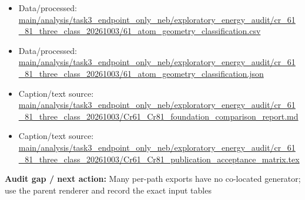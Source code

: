 \documentclass[10pt]{article}
\newcommand{\statusline}[1]{\colorbox{gray!12}{\parbox{0.96\linewidth}{#1}}}
\begin{document}
\begin{itemize}[leftmargin=1.4em,noitemsep]
\item Data/processed: \begingroup\scriptsize\url{main/analysis/task3_endpoint_only_neb/exploratory_energy_audit/cr_61_81_three_class_20261003/61_atom_geometry_classification.csv}\endgroup
\item Data/processed: \begingroup\scriptsize\url{main/analysis/task3_endpoint_only_neb/exploratory_energy_audit/cr_61_81_three_class_20261003/61_atom_geometry_classification.json}\endgroup
\item Caption/text source: \begingroup\scriptsize\url{main/analysis/task3_endpoint_only_neb/exploratory_energy_audit/cr_61_81_three_class_20261003/Cr61_Cr81_foundation_comparison_report.md}\endgroup
\item Caption/text source: \begingroup\scriptsize\url{main/analysis/task3_endpoint_only_neb/exploratory_energy_audit/cr_61_81_three_class_20261003/Cr61_Cr81_publication_acceptance_matrix.tex}\endgroup
\end{itemize}
\statusline{\textbf{Audit gap / next action:} Many per-path exports have no co-located generator; use the parent renderer and record the exact input tables}
\vfill
\clearpage
\end{document}
